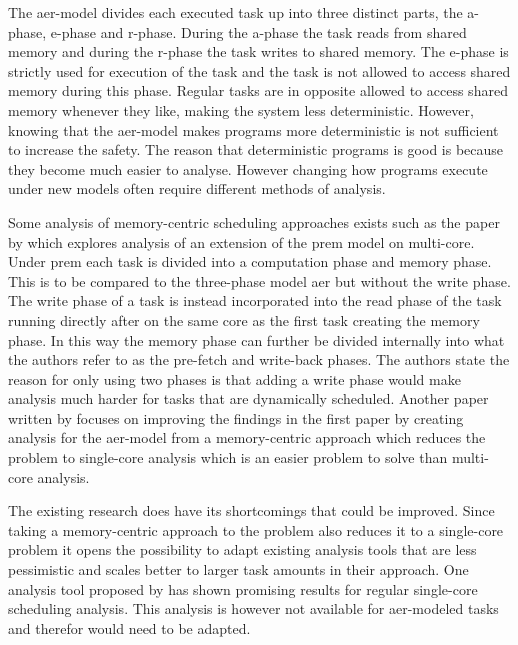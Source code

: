 \documentclass{kththesis}
\begin{document}
The \acrshort{aer}-model divides each executed task up into three distinct parts, the
\acrfull{a}-phase, \acrfull{e}-phase and \acrfull{r}-phase. During the \acrshort{a}-phase the task
reads from shared memory and during the \acrshort{r}-phase the task writes to shared memory. The
\acrshort{e}-phase is strictly used for execution of the task and the task is not allowed to access
shared memory during this phase. Regular tasks are in opposite allowed to access shared memory
whenever they like, making the system less deterministic. However, knowing that the
\acrshort{aer}-model makes programs more deterministic is not sufficient to increase the safety. The
reason that deterministic programs is good is because they become much easier to analyse. However
changing how programs execute under new models often require different methods of analysis.


Some analysis of memory-centric scheduling approaches exists such as the paper by
\textcite{alhammad_schedulability_2014} which explores analysis of an extension of the
\acrshort{prem} model on multi-core. Under \acrshort{prem} each task is divided into a computation
phase and memory phase. This is to be compared to the three-phase model \acrshort{aer} but without
the write phase. The write phase of a task is instead incorporated into the read phase of the task
running directly after on the same core as the first task creating the memory phase. In this way the
memory phase can further be divided internally into what the authors refer to as the pre-fetch and
write-back phases. The authors state the reason for only using two phases is that adding a write
phase would make analysis much harder for tasks that are dynamically scheduled. Another paper
written by \textcite{maia_schedulability_2017} focuses on improving the findings in the first paper
by creating analysis for the \acrshort{aer}-model from a memory-centric approach which reduces the
problem to single-core analysis which is an easier problem to solve than multi-core analysis.


The existing research does have its shortcomings that could be improved. Since taking a
memory-centric approach to the problem also reduces it to a single-core problem it opens the
possibility to adapt existing analysis tools that are less pessimistic and scales better to larger
task amounts in their approach. One analysis tool proposed by \textcite{nasri_exact_2017} has shown
promising results for regular single-core scheduling analysis. This analysis is however not
available for \acrshort{aer}-modeled tasks and therefor would need to be adapted.
\end{document}
